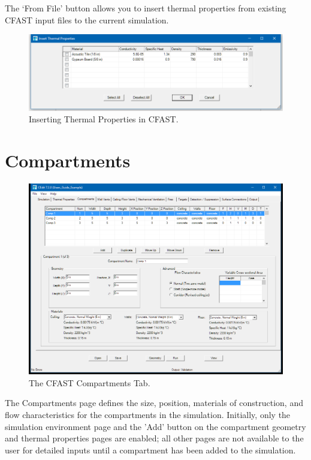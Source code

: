 The `From File' button allows you to insert thermal properties from existing CFAST input files to the current simulation.

\begin{figure}[h!]
\includegraphics[width=6.5in]{FIGURES/Insert_Thermal_Properties}
\caption[Inserting Thermal Properties in CFAST]{Inserting Thermal Properties in CFAST.}
\end{figure}





\chapter{Compartments}
\begin{figure}[h!]
\begin{center}
\includegraphics[width=6.5in]{FIGURES/Compartment_Geometry_Tab}
\caption[The CFAST Compartments Tab]{The CFAST Compartments Tab.}
\end{center}
\end{figure}

The Compartments page defines the size, position, materials of construction, and flow characteristics for the compartments in the simulation. Initially, only the simulation environment page and the 'Add' button on the compartment geometry and thermal properties pages are enabled; all other pages are not available to the user for detailed inputs until a compartment has been added to the simulation.

